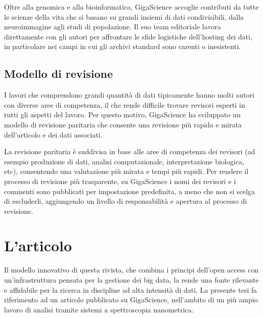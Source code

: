 \documentclass[../main.tex]{subfiles}
\begin{document}
Oltre alla genomica e alla bioinformatica, GigaScience accoglie contributi da tutte le scienze della vita che si basano su grandi insiemi di dati condivisibili, dalla neuroimmagine agli studi di popolazione. Il suo team editoriale lavora direttamente con gli autori per affrontare le sfide logistiche dell'hosting dei dati, in particolare nei campi in cui gli archivi standard sono carenti o inesistenti.

\subsection{Modello di revisione}

I lavori che comprendono grandi quantità di dati tipicamente hanno molti autori con diverse aree di competenza, il che rende difficile trovare revisori esperti in tutti gli aspetti del lavoro.
Per questo motivo, GigaScience ha sviluppato un modello di revisione paritaria  che consente una revisione più rapida e mirata dell'articolo e dei dati associati.

La revisione paritaria è suddivisa in base alle aree di competenza dei revisori (ad esempio produzione di dati, analisi computazionale, interpretazione biologica, etc), consentendo una valutazione più mirata e tempi più rapidi.
Per rendere il processo di revisione più trasparente, su GigaScience i nomi dei revisori e i commenti sono pubblicati per impostazione predefinita, a meno che non si scelga di escluderli, aggiungendo un livello di responsabilità e apertura al processo di revisione.

\section{L'articolo}

Il modello innovativo di questa rivista, che combina i principi dell’open access con un’infrastruttura pensata per la gestione dei big data, la rende una fonte rilevante e affidabile per la ricerca in discipline ad alta intensità di dati.
La presente tesi fa riferimento ad un articolo pubblicato su GigaScience, nell’ambito di un più ampio lavoro di analisi tramite sistemi a spettroscopia nanometrica.
\end{document}
